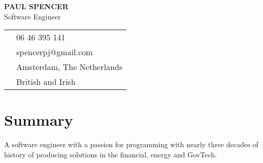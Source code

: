 \documentclass[11pt,a4paper]{article}
\newcommand{\contactItem}[2]{
    {\color{secondary}\small#1} & #2 \\
}
\begin{document}
\begin{center}
    {\Huge\textbf{PAUL SPENCER}}\\[0.5em]
    {\color{secondary}\large Software Engineer}\\[1em]
\end{center}

\begin{tabular}{ll}
    \contactItem{\faPhone}{06 46 395 141}
    \contactItem{\faEnvelope}{spencerpj@gmail.com}
    \contactItem{\faMapMarker}{Amsterdam, The Netherlands}
    \contactItem{\faFlag}{British and Irish}
\end{tabular}

\section{Summary}
A software engineer with a passion for programming with nearly three decades of history of producing solutions in the financial, energy and GovTech.
\end{document}
